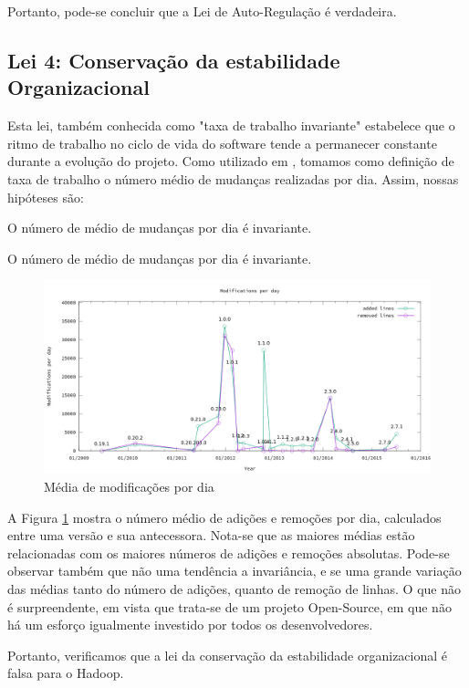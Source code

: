 Portanto, pode-se concluir que a Lei de Auto-Regulação é verdadeira.


\subsection{Lei 4: Conservação da estabilidade Organizacional}
Esta lei, também conhecida como "taxa de trabalho invariante" estabelece que o ritmo de trabalho no ciclo de vida do software tende a permanecer constante durante a evolução do projeto. Como utilizado em \cite{neamtiu2013towards}, tomamos como definição de taxa de trabalho o número médio de mudanças realizadas por dia. Assim, nossas hipóteses são:
\begin{hypothesis}
	O número de médio de mudanças por dia é invariante.
\end{hypothesis}

\begin{hypothesis}
	O número de médio de mudanças por dia é invariante.
\end{hypothesis}
\begin{figure}
	\centering
	\includegraphics[width=0.7\linewidth]{figure/modifications_per_day}
	\caption{Média de modificações por dia}
	\label{fig:modificationsperday}
\end{figure}


A Figura \ref{fig:modificationsperday} mostra o número médio de adições e remoções por dia, calculados entre uma versão e sua antecessora. Nota-se que as maiores médias estão relacionadas com os maiores números de adições e remoções absolutas. Pode-se observar também que não uma tendência a invariância, e se uma grande variação das médias tanto do número de adições, quanto de remoção de linhas. O que não é surpreendente, em vista que trata-se de um projeto Open-Source, em que não há um esforço igualmente investido por todos os desenvolvedores.

Portanto, verificamos que a lei da conservação da estabilidade organizacional é falsa para o Hadoop.
